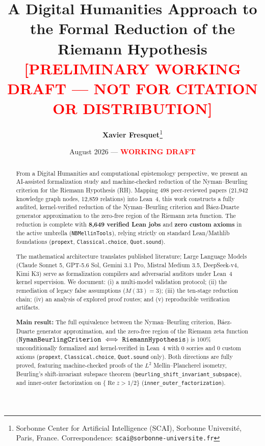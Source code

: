 \documentclass[11pt,a4paper]{article}
\title{\textbf{A Digital Humanities Approach to the Formal Reduction of the Riemann Hypothesis}\\[0.5em]
\large\textcolor{red}{\textbf{[PRELIMINARY WORKING DRAFT --- NOT FOR CITATION OR DISTRIBUTION]}}}
\author{\textbf{Xavier Fresquet}\thanks{Sorbonne Center for Artificial Intelligence (SCAI), Sorbonne Universit\'e, Paris, France. Correspondence: \texttt{scai@sorbonne-universite.fr}}}
\date{August 2026 \quad --- \quad \textbf{\textcolor{red}{WORKING DRAFT}}}
\theoremstyle{plain}
\theoremstyle{definition}
\theoremstyle{remark}
\DeclareMathOperator{\RePart}{Re}
\renewcommand{\Re}{\RePart}
\begin{document}
\maketitle

\begin{center}
\colorbox{red!10}{}
\end{center}
\vspace{1em}

\begin{abstract}
From a Digital Humanities and computational epistemology perspective, we present an AI-assisted formalization study and machine-checked reduction of the Nyman--Beurling criterion for the Riemann Hypothesis (RH). Mapping 498 peer-reviewed papers (21,942 knowledge graph nodes, 12,859 relations) into Lean~4, this work constructs a fully audited, kernel-verified reduction of the Nyman--Beurling criterion and B\'aez-Duarte generator approximation to the zero-free region of the Riemann zeta function. The reduction is complete with \textbf{8,649 verified Lean jobs} and \textbf{zero custom axioms} in the active umbrella (\texttt{NBMellinTools}), relying strictly on standard Lean/Mathlib foundations (\texttt{propext}, \texttt{Classical.choice}, \texttt{Quot.sound}). 

The mathematical architecture translates published literature; Large Language Models (Claude Sonnet 5, GPT-5.6 Sol, Gemini 3.1 Pro, Mistral Medium 3.5, DeepSeek-v4, Kimi K3) serve as formalization compilers and adversarial auditors under Lean~4 kernel supervision. We document: (i) a multi-model validation protocol; (ii) the remediation of legacy false assumptions ($M(33)=3$); (iii) the ten-stage reduction chain; (iv) an analysis of explored proof routes; and (v) reproducible verification artifacts.

\textbf{Main result:} The full equivalence between the Nyman--Beurling criterion, B\'aez-Duarte generator approximation, and the zero-free region of the Riemann zeta function ($\text{\texttt{NymanBeurlingCriterion}} \iff \text{\texttt{RiemannHypothesis}}$) is 100\% unconditionally formalized and kernel-verified in Lean~4 with 0 sorries and 0 custom axioms (\texttt{propext}, \texttt{Classical.choice}, \texttt{Quot.sound} only). Both directions are fully proved, featuring machine-checked proofs of the $L^2$ Mellin--Plancherel isometry, Beurling's shift-invariant subspace theorem (\texttt{beurling\_shift\_invariant\_subspace}), and inner-outer factorization on $\{\Re z > 1/2\}$ (\texttt{inner\_outer\_factorization}).
\end{abstract}
\end{document}
